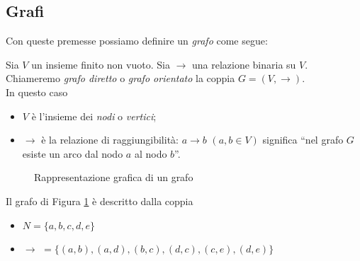 \subsection{Grafi}
Con queste premesse possiamo definire un \emph{grafo} come segue:
\begin{definition}
    Sia $V$ un insieme finito non vuoto. Sia $\to$ una relazione binaria su $V$.\\
    Chiameremo \emph{grafo diretto} o \emph{grafo orientato} la coppia $G = (V, \to)$.\\
    In questo caso
    \begin{itemize}
        \item $V$ è l'insieme dei \emph{nodi} o \emph{vertici};
        \item $\to$ è la relazione di raggiungibilità: $a \to b \,\,(a,b \in V)$ significa ``nel grafo $G$ esiste un arco dal nodo $a$ al nodo $b$''.
    \end{itemize}
\end{definition}
\begin{example}
    \begin{figure}[b]
        \centering
        \caption{Rappresentazione grafica di un grafo}
        \label{fig:graph}
    \end{figure}
    Il grafo di Figura \ref*{fig:graph} è descritto dalla coppia
    \begin{itemize}
        \item $N = \{a,b,c,d,e\}$
        \item $\to \,\,= \{(a,b), (a,d), (b,c), (d,c), (c,e), (d,e)\}$
    \end{itemize}
\end{example}
